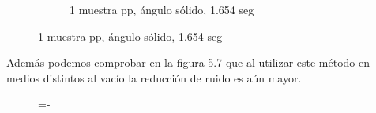 \begin{figure}[h!]
{\begin{minipage}{\dimexpr .5\textwidth-\fboxsep-2\fboxrule}
\begin{subfigure}{\textwidth}
            \caption{1 muestra pp, ángulo sólido, 1.654 seg}
            \end{subfigure}  
    \end{minipage}}
\end{figure}

Además podemos comprobar en la figura 5.7 que al utilizar este método en medios distintos al vacío la reducción de ruido es aún mayor.

\begin{figure}[h!]
  \lineskip=-\fboxrule
\end{figure}
